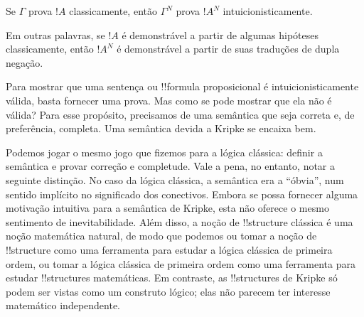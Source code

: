 \documentclass[../../../include/open-logic-section]{subfiles}
\begin{document}
\begin{thm}
Se $\Gamma$ prova $!A$ classicamente, então $\Gamma^N$ prova $!A^N$
intuicionisticamente.
\end{thm}

Em outras palavras, se $!A$ é demonstrável a partir de algumas hipóteses
classicamente, então $!A^N$ é demonstrável a partir de suas traduções
de dupla negação.

Para mostrar que uma sentença ou !!{formula} proposicional é
intuicionisticamente válida, basta fornecer uma prova. Mas como se pode
mostrar que ela não é válida? Para esse propósito, precisamos de uma
semântica que seja correta e, de preferência, completa. Uma semântica
devida a Kripke se encaixa bem.

Podemos jogar o mesmo jogo que fizemos para a lógica clássica: definir a
semântica e provar correção e completude. Vale a pena, no entanto, notar
a seguinte distinção. No caso da lógica clássica, a semântica era a
``óbvia'', num sentido implícito no significado dos conectivos. Embora
se possa fornecer alguma motivação intuitiva para a semântica de Kripke,
esta não oferece o mesmo sentimento de inevitabilidade. Além disso, a
noção de !!{structure} clássica é uma noção matemática natural, de modo
que podemos ou tomar a noção de !!{structure} como uma ferramenta para
estudar a lógica clássica de primeira ordem, ou tomar a lógica clássica
de primeira ordem como uma ferramenta para estudar !!{structure}s
matemáticas. Em contraste, as !!{structure}s de Kripke só podem ser
vistas como um construto lógico; elas não parecem ter interesse
matemático independente.
\end{document}
